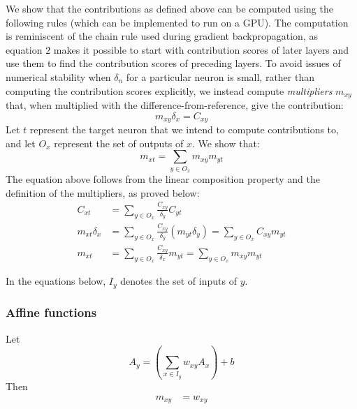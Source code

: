 \documentclass{article}
\begin{document}
We show that the contributions as defined above can be computed using the following rules (which can be implemented to run on a GPU). The computation is reminiscent of the chain rule used during gradient backpropagation, as equation $2$ makes it possible to start with contribution scores of later layers and use them to find the contribution scores of preceding layers. To avoid issues of numerical stability when $\delta_n$ for a particular neuron is small, rather than computing the contribution scores explicitly, we instead compute \emph{multipliers} $m_{xy}$ that, when multiplied with the difference-from-reference, give the contribution:
\begin{equation}
m_{xy} \delta_x = C_{xy}
\end{equation} 
Let $t$ represent the target neuron that we intend to compute contributions to, and let $O_x$ represent the set of outputs of $x$. We show that:
\begin{equation}
m_{xt} = \sum_{y \in O_x} m_{xy}m_{yt}
\end{equation} 
The equation above follows from the linear composition property and the definition of the multipliers, as proved below:
\begin{equation}
\begin{aligned}
C_{xt} &= \sum_{y \in O_x} \frac{C_{xy}}{\delta_y}C_{yt}\\
m_{xt} \delta_x &= \sum_{y \in O_x} \frac{C_{xy}}{\delta_y}(m_{yt} \delta_y) = \sum_{y \in O_x} C_{xy}m_{yt}\\
m_{xt} &= \sum_{y \in O_x} \frac{C_{xy}}{\delta_x}m_{yt} = \sum_{y \in O_x} m_{xy} m_{yt}
\end{aligned}
\end{equation} 

In the equations below, $I_y$ denotes the set of inputs of $y$.

\subsubsection{Affine functions}
Let
\begin{equation}
A_y = \left(\sum_{x \in I_y} w_{xy} A_x\right) + b  
\end{equation}
Then
\begin{equation}
\begin{aligned}
m_{xy} &= w_{xy}
\end{aligned}
\end{equation}
\end{document}
